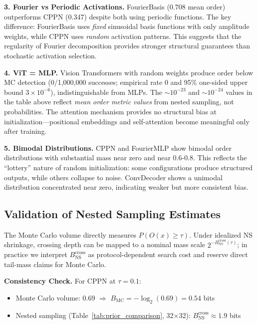 \textbf{3. Fourier vs Periodic Activations.} FourierBasis (0.708 mean order) outperforms CPPN (0.347) despite both using periodic functions. The key difference: FourierBasis uses \emph{fixed} sinusoidal basis functions with only amplitude weights, while CPPN uses \emph{random} activation patterns. This suggests that the regularity of Fourier decomposition provides stronger structural guarantees than stochastic activation selection.

\textbf{4. ViT = MLP.} Vision Transformers with random weights produce order below MC detection (0/1,000,000 successes; empirical rate 0 and 95\% one-sided upper bound $3\times10^{-6}$), indistinguishable from MLPs. The $\sim 10^{-23}$ and $\sim 10^{-24}$ values in the table above reflect \emph{mean order metric values} from nested sampling, not probabilities. The attention mechanism provides no structural bias at initialization---positional embeddings and self-attention become meaningful only after training.

\textbf{5. Bimodal Distributions.} CPPN and FourierMLP show bimodal order distributions with substantial mass near zero and near 0.6-0.8. This reflects the ``lottery'' nature of random initialization: some configurations produce structured outputs, while others collapse to noise. ConvDecoder shows a unimodal distribution concentrated near zero, indicating weaker but more consistent bias.

\subsection{Validation of Nested Sampling Estimates}

The Monte Carlo volume directly measures $P(O(x) \geq \tau)$. Under idealized NS shrinkage, crossing depth can be mapped to a nominal mass scale $2^{-B_{\text{NS}}^{\text{cross}}(\tau)}$; in practice we interpret $B_{\text{NS}}^{\text{cross}}$ as protocol-dependent search cost and reserve direct tail-mass claims for Monte Carlo.

\textbf{Consistency Check.} For CPPN at $\tau = 0.1$:
\begin{itemize}
    \item Monte Carlo volume: 0.69 $\Rightarrow$ $B_{\text{MC}} = -\log_2(0.69) = 0.54$ bits
    \item Nested sampling (Table~\ref{tab:prior_comparison}, 32$\times$32): $B_{\text{NS}}^{\text{cross}} \approx 1.9$ bits
\end{itemize}

